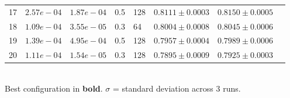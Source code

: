 \begin{table}[H]
\begin{tabular}{clllllll}
17 & $2.57e-04$ & $1.87e-04$ & 0.5 & 128 & $0.8111 \pm 0.0003$ & $0.8150 \pm 0.0005$ \\
18 & $1.09e-04$ & $3.55e-05$ & 0.3 & 64 & $0.8004 \pm 0.0008$ & $0.8045 \pm 0.0006$ \\
19 & $1.39e-04$ & $4.95e-04$ & 0.5 & 128 & $0.7957 \pm 0.0004$ & $0.7989 \pm 0.0006$ \\
20 & $1.11e-04$ & $1.54e-05$ & 0.3 & 128 & $0.7895 \pm 0.0009$ & $0.7925 \pm 0.0003$ \\
\bottomrule
\end{tabular}
\\[4pt]\footnotesize Best configuration in \textbf{bold}. $\sigma$ = standard deviation across 3 runs.
\end{table}
